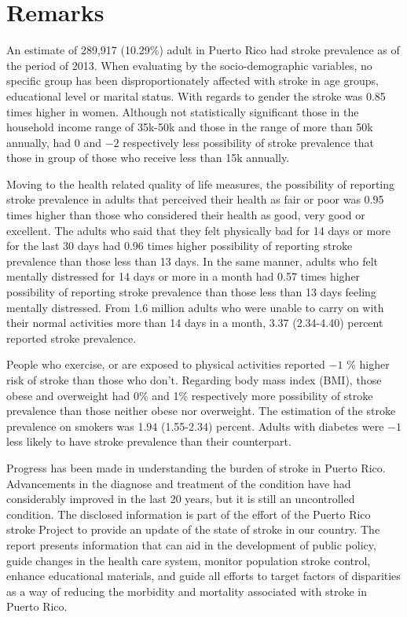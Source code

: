  \section{Remarks}

An estimate of 289,917 
(10.29\%) adult in Puerto Rico had stroke prevalence as of the period of 2013.
When evaluating by the socio-demographic variables, no specific group has been disproportionately affected with stroke in age groups, educational level or marital status. With regards to gender the stroke was 0.85 times higher in women. Although not statistically significant those in the household income range of 35k-50k and those in the range of more than 50k annually, had 0 and \ensuremath{-2} respectively less possibility of stroke prevalence that those  in group of those who receive less than 15k annually.

Moving to the health related quality of life measures, the possibility of reporting stroke prevalence in adults that perceived their health as fair or poor was 0.95 times higher than those who considered their health as good, very good or excellent. The adults who said that they felt physically bad for 14 days or more for the last 30 days had 0.96 times higher possibility of reporting stroke prevalence than those less than 13 days. In the same manner, adults who felt mentally distressed for 14 days or more in a month had 0.57 times higher possibility of reporting stroke prevalence than those less than 13 days feeling mentally distressed. From 1.6 million adults who were unable to carry on with their normal activities more than 14 days in a month, 3.37 (2.34-4.40) percent reported stroke prevalence. 

People who exercise, or are exposed to physical activities reported \ensuremath{-1} \% higher risk of stroke than those who don't.  Regarding body mass index (BMI), those obese and overweight had 0\% and 1\% respectively more possibility of stroke prevalence than those neither obese nor overweight. The estimation of the stroke prevalence on smokers was 1.94 (1.55-2.34) percent.  Adults with diabetes were \ensuremath{-1}\5 less likely to have stroke prevalence than their counterpart.



Progress has been made in understanding the burden of stroke in Puerto Rico. Advancements in the diagnose and treatment of the condition have had considerably improved in the last 20 years, but it is still an uncontrolled condition. The disclosed information is part of the effort of the Puerto Rico stroke Project to provide an update of the state of stroke in our country. The report presents information that can aid in the development of public policy, guide changes in the health care system, monitor population stroke control, enhance educational materials, and guide all efforts to target factors of disparities as a way of reducing the morbidity and mortality associated with stroke in Puerto Rico.

